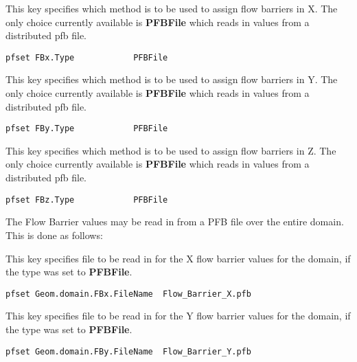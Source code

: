 {
This key specifies which method is to be used to assign flow barriers in X.  The only choice currently
available is {\bf PFBFile} which reads in values from a distributed pfb file.
}
\begin{display}\begin{verbatim}
pfset FBx.Type            PFBFile
\end{verbatim}\end{display}

{
This key specifies which method is to be used to assign flow barriers in Y.  The only choice currently
available is {\bf PFBFile} which reads in values from a distributed pfb file.
}
\begin{display}\begin{verbatim}
pfset FBy.Type            PFBFile
\end{verbatim}\end{display}

{
This key specifies which method is to be used to assign flow barriers in Z.  The only choice currently
available is {\bf PFBFile} which reads in values from a distributed pfb file.
}
\begin{display}\begin{verbatim}
pfset FBz.Type            PFBFile
\end{verbatim}\end{display}

The Flow Barrier values may be read in from a PFB file over the entire domain.  This is done as follows:

{
This key specifies file to be read in for the X flow barrier values for the domain, if the type was set to {\bf PFBFile}.
}
\begin{display}\begin{verbatim}
pfset Geom.domain.FBx.FileName  Flow_Barrier_X.pfb
\end{verbatim}\end{display}

{
This key specifies file to be read in for the Y flow barrier values for the domain, if the type was set to {\bf PFBFile}.
}
\begin{display}\begin{verbatim}
pfset Geom.domain.FBy.FileName  Flow_Barrier_Y.pfb
\end{verbatim}\end{display}


